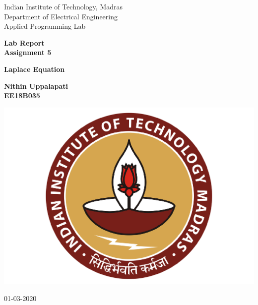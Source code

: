 \documentclass[10pt,english, openany]{book}
\begin{document}

\begin{titlepage}
	\clearpage\thispagestyle{empty}
	\centering
	\vspace{1cm}

	{\Large Indian Institute of Technology, Madras \\ 
		Department of Electrical Engineering \\
		Applied Programming Lab \par}
		\vspace{3cm}
	{\LARGE \textbf{Lab Report}} \\
    \LARGE \textbf{Assignment 5} \\
	{\Huge \textbf{Laplace Equation} \par}
	\vspace{3cm}
	{\large \textbf{Nithin Uppalapati} \\ 
     \large \textbf{EE18B035} \\%
	\vspace{2cm}
    
    \centering \includegraphics[scale=0.2]{IITm.pdf}
%     
    \vspace{1.5cm}
		
	{\normalsize 01-03-2020 \par}
	
	\pagebreak
}
\end{titlepage}
\end{document}
